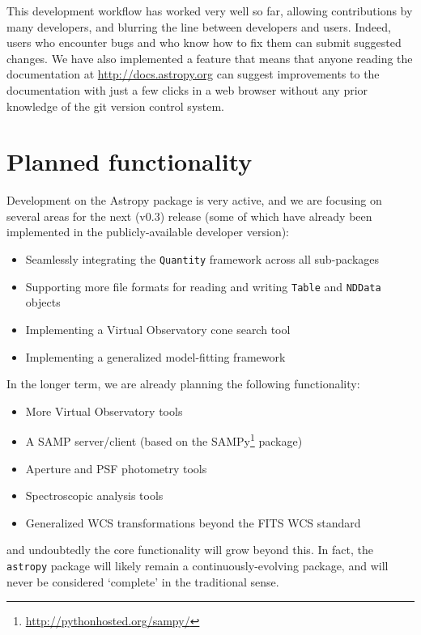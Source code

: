 \documentclass[traditabstract]{aa}
\newcommand{\astropy}{\texttt{astropy}\xspace}
\begin{document}
This development workflow has worked very well so far, allowing contributions
by many developers, and blurring the line between developers and users. Indeed,
users who encounter bugs and who know how to fix them can submit suggested
changes. We have also implemented a feature that means that anyone reading the
documentation at \url{http://docs.astropy.org} can suggest improvements to the
documentation with just a few clicks in a web browser without any prior
knowledge of the git version control system.

\section{Planned functionality}

\label{sec:future}


Development on the Astropy package is very active, and we are focusing on several areas for
the next (v0.3) release (some of which have already been implemented in the
publicly-available developer version):

\begin{itemize}
\item Seamlessly integrating the \texttt{Quantity} framework across all sub-packages
\item Supporting more file formats for reading and writing \texttt{Table} and \texttt{NDData} objects
\item Implementing a Virtual Observatory cone search tool
\item Implementing a generalized model-fitting framework
\end{itemize}

In the longer term, we are already planning the following functionality:

\begin{itemize}
\item More Virtual Observatory tools
\item A SAMP server/client (based on the SAMPy\footnote{\url{http://pythonhosted.org/sampy/}} package)
\item Aperture and PSF photometry tools
\item Spectroscopic analysis tools
\item Generalized WCS transformations beyond the FITS WCS standard
\end{itemize}

\noindent and undoubtedly the core functionality will grow beyond this. In
fact, the \astropy package will likely remain a continuously-evolving package,
and will never be considered `complete' in the traditional sense.
\end{document}
